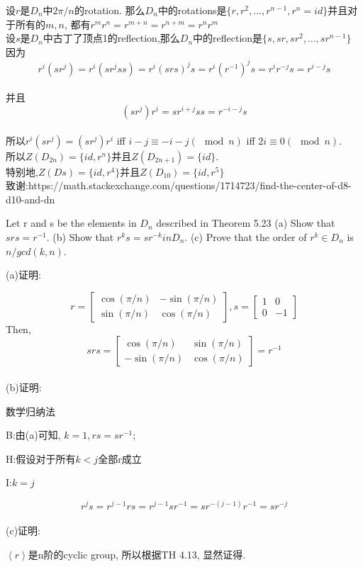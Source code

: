 \documentclass[a4paper, justified]{tufte-handout}
\begin{document}
\begin{solution}
	设$r$是$D_n$中$2\pi / n$的rotation. 那么$D_n$中的rotations是$\{r,r^2,...,r^{n-1},r^n=id\}$并且对于所有的$m,n$, 都有$r^mr^n=r^{m+n}=r^{n+m}=r^nr^m$\\
	设$s$是$D_n$中古丁了顶点1的reflection,那么$D_n$中的reflection是$\{s,sr,sr^2,...,sr^{n-1}\}$\\
	因为$$r^i(sr^j)=r^i(sr^jss)=r^i(srs)^js=r^i(r^{-1})^js=r^ir^{-j}s=r^{i-j}s$$\\
	并且$$(sr^j)r^i=sr^{i+j}ss=r^{-i-j}s$$\\
	所以$r^i(sr^j)=(sr^j)r^i$ iff $i-j\equiv -i-j(\mod n)$ iff $2i \equiv 0(\mod n)$.\\
	所以$Z(D_{2n})=\{id,r^n\}$并且$Z(D_{2n+1})=\{id\}$.\\
	特别地,$Z(Ds)=\{id,r^4\}$并且$Z(D_{10})=\{id,r^5\}$\\

	致谢:https://math.stackexchange.com/questions/1714723/find-the-center-of-d8-d10-and-dn
\end{solution}

\begin{problem}[TJ 5-36]
Let r and s be the elements in $D_n$ described in Theorem 5.23
(a) Show that $srs = r^{-1}$.
(b) Show that $r^ks = sr^{-k} in D_n$.
(c) Prove that the order of $r^k \in D_n$ is $n/ gcd(k, n)$.
\end{problem}

\begin{solution}
	(a)证明:

	$$
		r=\left[\begin{array}{cc}
				\cos (\pi / n) & -\sin (\pi / n) \\
				\sin (\pi / n) & \cos (\pi / n)
			\end{array}\right], s=\left[\begin{array}{cc}
				1 & 0  \\
				0 & -1
			\end{array}\right]
	$$
	Then,
	$$
		s r s=\left[\begin{array}{cc}
				\cos (\pi / n)  & \sin (\pi / n) \\
				-\sin (\pi / n) & \cos (\pi / n)
			\end{array}\right]=r^{-1}
	$$\\
	(b)证明:

	数学归纳法

	B:由(a)可知, $k=1,rs=sr^{-1}$;

	H:假设对于所有$k<j$全部r成立

	I:$k=j$

	$$r^js=r^{j-1}rs=r^{j-1}sr^{-1}=sr^{-(j-1)}r^{-1}=sr^{-j}$$
	\\
	(c)证明:

	$\left\langle r \right\rangle$是n阶的cyclic group, 所以根据TH 4.13, 显然证得.
\end{solution}
\end{document}

